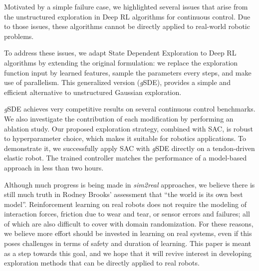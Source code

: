 \documentclass{article}
\newcommand{\sde}{State Dependent Exploration\xspace}
\newcommand{\ourSDE}{\textit{g}\textsc{SDE}\xspace}
\newcommand{\sac}{\textsc{SAC}\xspace}
\begin{document}
Motivated by a simple failure case, we highlighted several issues that arise from the unstructured exploration in Deep RL algorithms for continuous control. Due to those issues, these algorithms cannot be directly applied to real-world robotic problems.

To address these issues, we adapt \sde to Deep RL algorithms by extending the original formulation: we replace the exploration function input by learned features, sample the parameters every  steps, and make use of parallelism. This generalized version (\ourSDE), provides a simple and efficient alternative to unstructured Gaussian exploration.

\ourSDE achieves very competitive results on several continuous control benchmarks. We also investigate the contribution of each modification by performing an ablation study. Our proposed exploration strategy, combined with \sac, is robust to hyperparameter choice, which makes it suitable for robotics applications. To demonstrate it, we successfully apply \sac with \ourSDE directly on a tendon-driven elastic robot. The trained controller matches the performance of a model-based approach in less than two hours.

Although much progress is being made in \textit{sim2real} approaches, we believe there is still much truth in Rodney Brooks' assessment that ``the world is its own best model''. Reinforcement learning on real robots does not require the modeling of interaction forces, friction due to wear and tear, or sensor errors and failures; all of which are also difficult to cover with domain randomization. For these reasons, we believe more effort should be invested in learning on real systems, even if this poses challenges in terms of safety and duration of learning. This paper is meant as a step towards this goal, and we hope that it will revive interest in developing exploration methods that can be directly applied to real robots.













\clearpage



  
\end{document}
